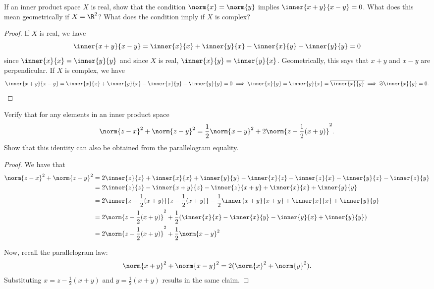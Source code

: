 \begin{question}
    If an inner product space $X$ is real, show that the condition $\norm{x} = \norm{y}$ implies $\inner{x+y}{x-y} = 0$. What does this mean geometrically if $X = \R^2$? What does the condition imply if $X$ is complex?
    \label{section3.1-4}
\end{question}
\begin{proof}
    If $X$ is real, we have
    \[\inner{x+y}{x-y} = \inner{x}{x} + \inner{y}{x} - \inner{x}{y} - \inner{y}{y} = 0\]
    since $\inner{x}{x} = \inner{y}{y}$ and since $X$ is real, $\inner{x}{y} = \inner{y}{x}$. Geometrically, this says that $x+y$ and $x-y$ are perpendicular. If $X$ is complex, we have
    \[\inner{x+y}{x-y} = \inner{x}{x} + \inner{y}{x} - \inner{x}{y} - \inner{y}{y} = 0 \implies \inner{x}{y} = \inner{y}{x} = \overline{\inner{x}{y}} \implies \Im\inner{x}{y} = 0.\]
\end{proof}

\begin{question}
    Verify that for any elements in an inner product space
    \[\norm{z-x}^2 + \norm{z-y}^2 = \frac{1}{2} \norm{x-y}^2 + 2 \norm{z - \frac{1}{2}(x+y)}^2.\]
    Show that this identity can also be obtained from the parallelogram equality.
    \label{section3.1-5}
\end{question}
\begin{proof}
    We have that
    \begin{align*}
        \norm{z-x}^2 + \norm{z-y}^2 &= 2\inner{z}{z} + \inner{x}{x} + \inner{y}{y} - \inner{x}{z} -\inner{z}{x} - \inner{y}{z} - \inner{z}{y}
        \\
        &= 2\inner{z}{z} -  \inner{x + y}{z} - \inner{z}{x+y} + \inner{x}{x} + \inner{y}{y}
        \\
        &= 2\inner{z-\frac{1}{2}(x+y)}{z-\frac{1}{2}(x+y)} - \frac{1}{2}\inner{x+y}{x+y} + \inner{x}{x} + \inner{y}{y}
        \\
        &= 2 \norm{z - \frac{1}{2}(x+y)}^2 + \frac{1}{2} (\inner{x}{x} - \inner{x}{y} - \inner{y}{x} + \inner{y}{y})
        \\
         &= 2 \norm{z - \frac{1}{2}(x+y)}^2 + \frac{1}{2} \norm{x-y}^2
    \end{align*}

    Now, recall the parallelogram law:
    \[\norm{x+y}^2 + \norm{x-y}^2 = 2(\norm{x}^2 + \norm{y}^2).\]
    Substituting $x = z - \frac{1}{2}(x+y)$ and $y = \frac{1}{2}(x+y)$ results in the same claim.
\end{proof}


